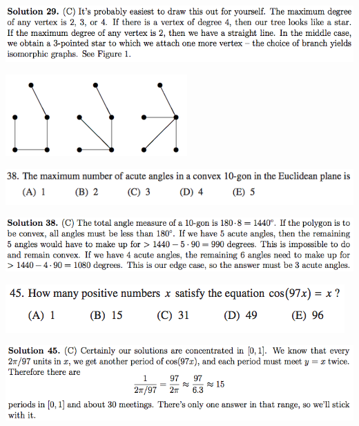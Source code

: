 \documentclass{article}
\begin{document}
\includegraphics[scale=0.65]{1268_28s}

\begin{center}
\includegraphics[scale=0.65]{1268_28fig}
\end{center}

\includegraphics[scale=0.65]{1268_38}

\includegraphics[scale=0.65]{1268_38s}

\includegraphics[scale=0.65]{1268_45}

\includegraphics[scale=0.65]{1268_45s}
\end{document}
